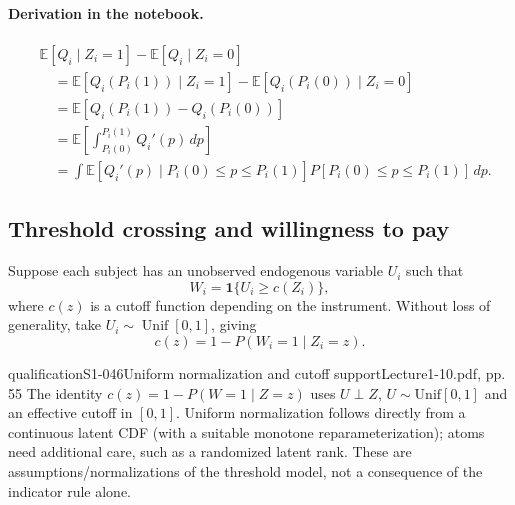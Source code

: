 \paragraph{Derivation in the notebook.}
\begin{align*}
 &\mathbb E[Q_i\mid Z_i=1]-\mathbb E[Q_i\mid Z_i=0]\\
 &\quad=\mathbb E[Q_i(P_i(1))\mid Z_i=1]
 -\mathbb E[Q_i(P_i(0))\mid Z_i=0]\\
 &\quad=\mathbb E[Q_i(P_i(1))-Q_i(P_i(0))]\\
 &\quad=\mathbb E\left[\int_{P_i(0)}^{P_i(1)}Q_i'(p)\,dp\right]\\
 &\quad=\int\mathbb E[Q_i'(p)\mid P_i(0)\le p\le P_i(1)]
 P[P_i(0)\le p\le P_i(1)]\,dp.
\end{align*}

\subsection{Threshold crossing and willingness to pay}
Suppose each subject has an unobserved endogenous variable $U_i$ such that
\[
 W_i=\mathbf1\{U_i\ge c(Z_i)\},
\]
where $c(z)$ is a cutoff function depending on the instrument. Without loss of generality, take $U_i\sim\operatorname{Unif}[0,1]$, giving
\[
 c(z)=1-P(W_i=1\mid Z_i=z).
\]
\begin{reviewnote}{qualification}{S1-046}{Uniform normalization and cutoff support}{Lecture1-10.pdf, pp. 55}
The identity $c(z)=1-P(W=1\mid Z=z)$ uses $U\perp Z$, $U\sim\mathrm{Unif}[0,1]$ and an effective cutoff in $[0,1]$. Uniform normalization follows directly from a continuous latent CDF (with a suitable monotone reparameterization); atoms need additional care, such as a randomized latent rank. These are assumptions/normalizations of the threshold model, not a consequence of the indicator rule alone.
\end{reviewnote}

